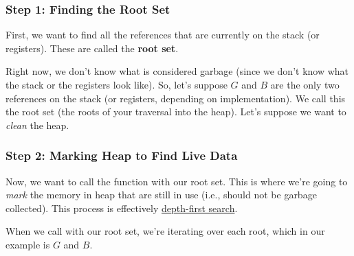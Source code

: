 \documentclass[letterpaper]{article}
\begin{document}
\subsubsection{Step 1: Finding the Root Set}
\begin{mdframed}
    First, we want to find all the references that are currently on the stack (or registers). These are called the \textbf{root set}.
\end{mdframed}
Right now, we don't know what is considered garbage (since we don't know what the stack or the registers look like). So, let's suppose $G$ and $B$ are the only two references on the stack (or registers, depending on implementation). We call this the root set (the roots of your traversal into the heap). Let's suppose we want to \emph{clean} the heap. 

\subsubsection{Step 2: Marking Heap to Find Live Data}
\begin{mdframed}
    Now, we want to call the  function with our root set. This is where we're going to \emph{mark} the memory in heap that are still in use (i.e., should not be garbage collected). This process is effectively \underline{depth-first search}.
\end{mdframed}
When we call  with our root set, we're iterating over each root, which in our example is $G$ and $B$. 
\end{document}
